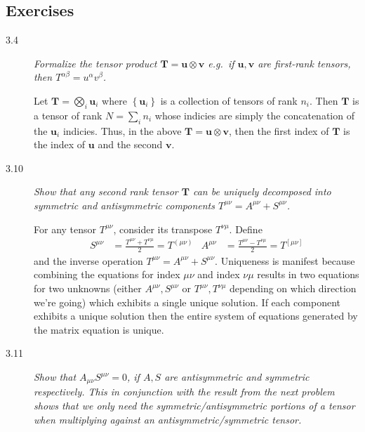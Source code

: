\documentclass[12pt]{report}
\begin{document}
\begin{description}
\end{description}

\subsection{Exercises}

\begin{description}
    \item[3.4] \emph{Formalize the tensor product $\mathbf{T} = \mathbf{u}
        \otimes \mathbf{v}$ e.g.\ if $\mathbf{u}, \mathbf{v}$ are first-rank
        tensors, then $T^{\alpha\beta} = u^\alpha v^\beta$.}

        Let $\mathbf{T} = \bigotimes_i \mathbf{u}_i$ where $\left\{ \mathbf{u}_i
        \right\}$ is a collection of tensors of rank $n_i$. Then $\mathbf{T}$ is
        a tensor of rank $N = \sum\limits_{i}^{}n_i$ whose indicies are simply
        the concatenation of the $\mathbf{u}_i$ indicies. Thus, in the above
        $\mathbf{T} = \mathbf{u} \otimes \mathbf{v}$, then the first index of
        $\mathbf{T}$ is the index of $\mathbf{u}$ and the second $\mathbf{v}$.

    \item[3.10] \emph{Show that any second rank tensor $\mathbf{T}$ can be
        uniquely decomposed into symmetric and antisymmetric components
        $T^{\mu\nu} = A^{\mu\nu} + S^{\mu\nu}$.}

        For any tensor $T^{\mu\nu}$, consider its transpose $T^{\nu\mu}$. Define
        \begin{align*}
            S^{\mu\nu} &= \frac{T^{\mu\nu} + T^{\nu\mu}}{2} = T^{(\mu\nu)} &
            A^{\mu\nu} &= \frac{T^{\mu\nu} - T^{\nu\mu}}{2} = T^{[\mu\nu]}
        \end{align*}
        and the inverse operation $T^{\mu\nu} = A^{\mu\nu} + S^{\mu\nu}$.
        Uniqueness is manifest because combining the equations for index
        $\mu\nu$ and index $\nu\mu$ results in two equations for two unknowns
        (either $A^{\mu\nu}, S^{\mu\nu}$ or $T^{\mu\nu}, T^{\nu\mu}$ depending
        on which direction we're going) which exhibits a single unique solution.
        If each component exhibits a unique solution then the entire system of
        equations generated by the matrix equation is unique.

    \item[3.11] \emph{Show that $A_{\mu\nu}S^{\mu\nu} = 0$, if $A,S$ are
        antisymmetric and symmetric respectively. This in conjunction with the
        result from the next problem shows that we only need the
        symmetric/antisymmetric portions of a tensor when multiplying against an
        antisymmetric/symmetric tensor.}


\end{description}
\end{document}

